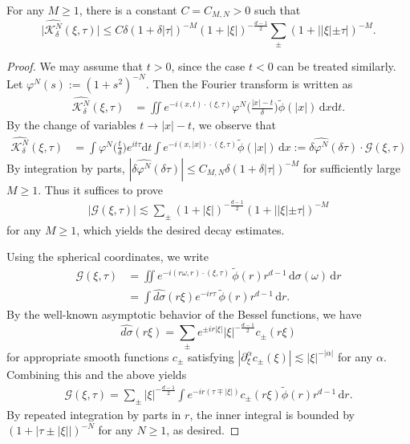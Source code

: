 \documentclass[10pt,a4paper]{amsart}
\def\d{\mathrm{d}}
\begin{document}
\begin{lemma}
\label{l:dispersive2}  
For any $M\ge 1$, there is a constant $C=C_{M,N}>0$ such that
\[
\big| \widehat{\mathcal K_\delta^N}(\xi,\tau)| \le C \delta (1+\delta|\tau|)^{-M} (1+|\xi|)^{-\frac{d-1}2} \sum_{\pm}(1+||\xi|\pm \tau|)^{-M}.
\]
\end{lemma}

\begin{proof}
We may assume that $t>0$, since the case $t<0$ can be treated similarly.
Let $\varphi^{N}(s) := (1+s^2)^{-N}$. Then the Fourier transform is written as
\begin{align*}
\widehat{\mathcal K_\delta^N}(\xi,\tau)
&=\iint e^{-i(x,t)\cdot (\xi,\tau)} \varphi^{N}\Big(\frac{|x|-t}{\delta}\Big) \tilde \phi(|x|)\,\d x\d t.
\end{align*}
By the change of variables $t\rightarrow |x|-t$, we observe that
\begin{align*}
\widehat{\mathcal K_\delta^N}(\xi,\tau)&=
\int \varphi^{N}\Big(\frac t\delta\Big)e^{it\tau}\d t
\int e^{-i(x,|x|)\cdot(\xi,\tau)} \tilde \phi(|x|)\,\d x
:= \delta \widehat{\varphi^{N}}(\delta\tau) \cdot \mathcal G(\xi,\tau)
\end{align*}
By integration by parts,
$
|\delta \widehat{\varphi^{N}}(\delta\tau)|
\le C_{M,N} \delta (1+\delta|\tau|)^{-M}
$
for sufficiently large $M\ge1$.
Thus it suffices to prove
\begin{align}\label{decaying}
|\mathcal G(\xi,\tau)| \lesssim \sum_{\pm} (1+|\xi|)^{-\frac{d-1}2} (1+||\xi|\pm \tau|)^{-M}
\end{align}
for any $M\ge 1$, which yields the desired decay estimates.


Using the spherical coordinates, we write
\begin{align*}
\mathcal G(\xi,\tau)
&= \iint   e^{-i(r\omega, r)\cdot(\xi,\tau)}\,\tilde\phi(r)r^{d-1}\,\d\sigma(\omega)\, \d r
\\ 
& =   \int   \widehat{d\sigma}(r\xi) e^{-i r\tau}\,\tilde\phi(r)r^{d-1}\, \d r.
\end{align*}
By the well-known asymptotic behavior of the Bessel functions, we have 
\[\widehat{d\sigma}(r\xi)=\sum_\pm e^{\pm ir|\xi|} |\xi|^{-\frac{d-1}2}c_\pm(r\xi)\]
for appropriate smooth functions $c_{\pm}$ satisfying $|\partial_\xi^\alpha c_\pm(\xi)|\lesssim |\xi|^{-|\alpha|}$ for any $\alpha$.
Combining this and the above yields 
\begin{align*}
\mathcal G(\xi,\tau)=\sum_{\pm}  |\xi|^{-\frac{d-1}2} \int e^{-i r(\tau \mp |\xi|)}c_\pm(r\xi) \tilde\phi(r)r^{d-1}\,\d r. 
\end{align*}
By repeated integration by parts in $r$, the inner integral is bounded by $(1+|\tau\pm|\xi||)^{-N}$ for any $N\ge1$, as desired.
\end{proof}
\end{document}
